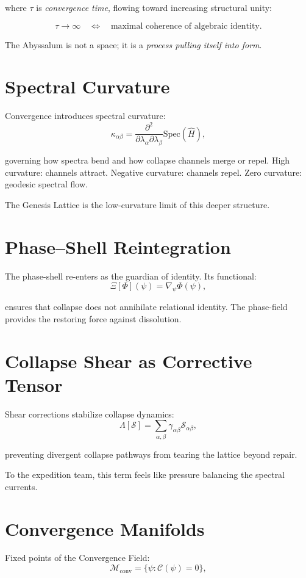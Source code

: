 where $\tau$ is \emph{convergence time}, flowing toward increasing structural unity:

\[
\tau \to \infty
\quad\Longleftrightarrow\quad
\text{maximal coherence of algebraic identity}.
\]

The Abyssalum is not a space; it is a \emph{process pulling itself into form}.

\section{Spectral Curvature}
Convergence introduces spectral curvature:
\[
\kappa_{\alpha\beta}
=
\frac{\partial^2}{\partial \lambda_\alpha \partial \lambda_\beta}
\mathrm{Spec}(\hat{H}),
\]

governing how spectra bend and how collapse channels merge or repel.
High curvature: channels attract.  
Negative curvature: channels repel.  
Zero curvature: geodesic spectral flow.

The Genesis Lattice is the low-curvature limit of this deeper structure.

\section{Phase--Shell Reintegration}
The phase-shell re-enters as the guardian of identity. Its functional:
\[
\Xi[\Phi](\psi)
=
\nabla_{\psi} \Phi(\psi),
\]

ensures that collapse does not annihilate relational identity.
The phase-field provides the restoring force against dissolution.

\section{Collapse Shear as Corrective Tensor}
Shear corrections stabilize collapse dynamics:
\[
\Lambda[\mathcal{S}]
=
\sum_{\alpha,\beta}
\gamma_{\alpha\beta} \mathcal{S}_{\alpha\beta},
\]

preventing divergent collapse pathways from tearing the lattice beyond repair.

To the expedition team, this term feels like pressure balancing the spectral currents.

\section{Convergence Manifolds}
Fixed points of the Convergence Field:
\[
\mathcal{M}_{\mathrm{conv}}
=
\{\psi : \mathcal{C}(\psi) = 0\},
\]

